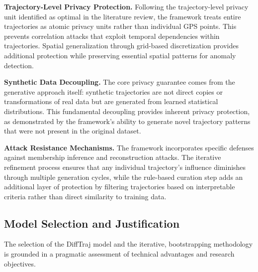 \documentclass[runningheads]{llncs}
\begin{document}
\textbf{Trajectory-Level Privacy Protection.} Following the trajectory-level privacy unit identified as optimal in the literature review, the framework treats entire trajectories as atomic privacy units rather than individual GPS points. This prevents correlation attacks that exploit temporal dependencies within trajectories. Spatial generalization through grid-based discretization provides additional protection while preserving essential spatial patterns for anomaly detection.

\textbf{Synthetic Data Decoupling.} The core privacy guarantee comes from the generative approach itself: synthetic trajectories are not direct copies or transformations of real data but are generated from learned statistical distributions. This fundamental decoupling provides inherent privacy protection, as demonstrated by the framework's ability to generate novel trajectory patterns that were not present in the original dataset.

\textbf{Attack Resistance Mechanisms.} The framework incorporates specific defenses against membership inference and reconstruction attacks. The iterative refinement process ensures that any individual trajectory's influence diminishes through multiple generation cycles, while the rule-based curation step adds an additional layer of protection by filtering trajectories based on interpretable criteria rather than direct similarity to training data.

\subsection{Model Selection and Justification}
\label{sec:model-selection}

The selection of the DiffTraj model and the iterative, bootstrapping methodology is grounded in a pragmatic assessment of technical advantages and research objectives.
\end{document}
